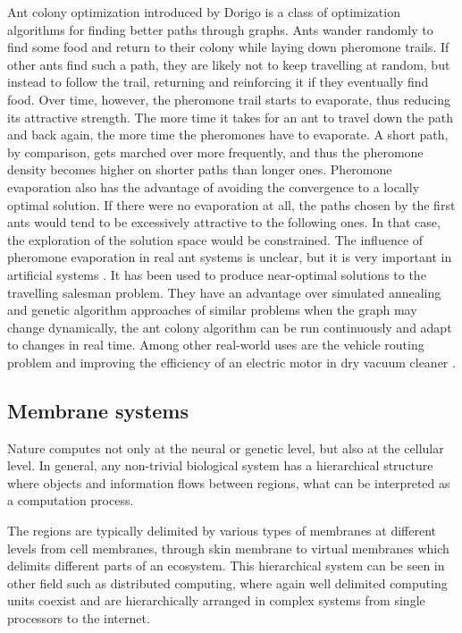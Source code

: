 Ant colony optimization  introduced by Dorigo \cite{Dorigo96Ants} is a class of optimization algorithms for finding better paths through graphs. Ants wander randomly to find some food and return to their colony while laying down pheromone trails. If other ants find such a path, they are likely not to keep travelling at random, but instead to follow the trail, returning and reinforcing it if they eventually find food. Over time, however, the pheromone trail starts to evaporate, thus reducing its attractive strength. The more time it takes for an ant to travel down the path and back again, the more time the pheromones have to evaporate. A short path, by comparison, gets marched over more frequently, and thus the pheromone density becomes higher on shorter paths than longer ones. Pheromone evaporation also has the advantage of avoiding the convergence to a locally optimal solution. If there were no evaporation at all, the paths chosen by the first ants would tend to be excessively attractive to the following ones. In that case, the exploration of the solution space would be constrained. The influence of pheromone evaporation in real ant systems is unclear, but it is very important in artificial systems \cite{Dorigo04Ants}. It has been used to produce near-optimal solutions to the travelling salesman problem. They have an advantage over simulated annealing and genetic algorithm approaches of similar problems when the graph may change dynamically, the ant colony algorithm can be run continuously and adapt to changes in real time. Among other real-world uses are the vehicle routing problem \cite{Rizzoli07AntsVehicle} and improving the efficiency of an electric motor in dry vacuum cleaner \cite{Korosec09AntsVacuum}.



\subsection{Membrane systems} %
\label{sub:membrane_systems}

Nature computes not only at the neural or genetic level, but also at the cellular level. In general, any non-trivial biological system has a hierarchical structure where objects and information flows between regions, what can be interpreted as a computation process.

The regions are typically delimited by various types of membranes at different levels from  cell membranes, through skin membrane to virtual membranes which delimits different parts of an ecosystem.
This hierarchical system can be seen in other field such as distributed computing, where again well delimited computing units coexist and are hierarchically arranged in complex systems from single processors to the internet.

